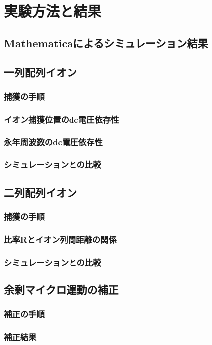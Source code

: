 \section{実験方法と結果}
\subsection{Mathematicaによるシミュレーション結果}
\subsection{一列配列イオン}
\subsubsection{捕獲の手順}
\subsubsection{イオン捕獲位置のdc電圧依存性}
\subsubsection{永年周波数のdc電圧依存性}
\subsubsection{シミュレーションとの比較}
\subsection{二列配列イオン}
\subsubsection{捕獲の手順}
\subsubsection{比率Rとイオン列間距離の関係}
\subsubsection{シミュレーションとの比較}

\subsection{余剰マイクロ運動の補正}
\subsubsection{補正の手順}
\subsubsection{補正結果}